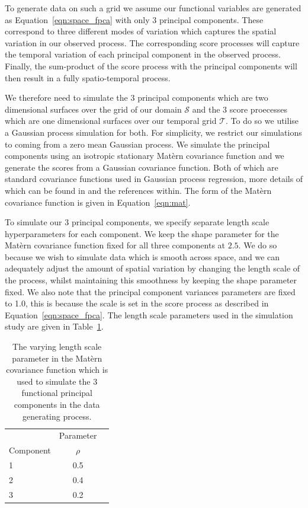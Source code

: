 To generate data on such a grid we assume our functional variables are generated as Equation~\eqref{eqn:space_fpca} with only $3$ principal components.
These correspond to three different modes of variation which captures the spatial variation in our observed process.
The corresponding score processes will capture the temporal variation of each principal component in the observed process.
Finally, the sum-product of the score process with the principal components will then result in a fully spatio-temporal process. 

We therefore need to simulate the $3$ principal components which are two dimensional surfaces over the grid of our domain $\mathcal{S}$ and the $3$ score proecesses which are one dimensional surfaces over our temporal grid $\mathcal{T}$.
To do so we utilise a Gaussian process simulation for both.
For simplicity, we restrict our simulations to coming from a zero mean Gaussian process.
We simulate the principal components using an isotropic stationary Mat\`{e}rn covariance function and we generate the scores from a Gaussian covariance function.
Both of which are standard covariance functions used in Gaussian process regression, more details of which can be found in \citep{williams_gaussian_2006} and the references within.
The form of the Mat\`{e}rn covariance function is given in Equation~\eqref{eqn:mat}. 

To simulate our $3$ principal components, we specify separate length scale hyperparameters for each component. 
We keep the shape parameter for the Mat\`{e}rn covariance function fixed for all three components at $2.5$. 
We do so because we wish to simulate data which is smooth across space, and we can adequately adjust the amount of spatial variation by changing the length scale of the process, whilst maintaining this smoothness by keeping the shape parameter fixed.
We also note that the principal component variances parameters are fixed to 1.0, this is because the scale is set in the score process as described in Equation~\eqref{eqn:space_fpca}.
The length scale parameters used in the simulation study are given in Table~\ref{tab:fpc_params}.

\begin{table}[htbp!] 
	\caption[Parameters for simulating functional principal component processes.]{The varying length scale parameter in the Mat\`{e}rn covariance function which is used to simulate the $3$ functional principal components in the data generating process.}
	\centering
	\label{tab:fpc_params}
	\begin{tabular}{l c c }
		\toprule
		& \multicolumn{1}{c}{Parameter} \\ 
		Component  & $\rho$ \\
		\midrule
		1 & 0.5 \\
		2 & 0.4 \\
		3 & 0.2 \\
		\bottomrule
	\end{tabular}
\end{table}

